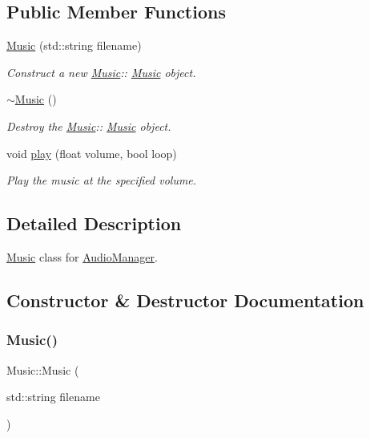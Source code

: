 \subsection*{Public Member Functions}
\begin{DoxyCompactItemize}
\item 
\hyperlink{class_music_a8169fdac350380994c08fe67062fc99d}{Music} (std\+::string filename)
\begin{DoxyCompactList}\small\item\em Construct a new \hyperlink{class_music}{Music}\+:\+: \hyperlink{class_music}{Music} object. \end{DoxyCompactList}\item 
\mbox{\label{class_music_a0b4f3b9a018207e0c08003505f1f87fe}} 
\hyperlink{class_music_a0b4f3b9a018207e0c08003505f1f87fe}{$\sim$\+Music} ()
\begin{DoxyCompactList}\small\item\em Destroy the \hyperlink{class_music}{Music}\+:\+: \hyperlink{class_music}{Music} object. \end{DoxyCompactList}\item 
void \hyperlink{class_music_a5ab263243b34b3f84e916b7b15854df5}{play} (float volume, bool loop)
\begin{DoxyCompactList}\small\item\em Play the music at the specified volume. \end{DoxyCompactList}\end{DoxyCompactItemize}


\subsection{Detailed Description}
\hyperlink{class_music}{Music} class for \hyperlink{class_audio_manager}{Audio\+Manager}. 

\subsection{Constructor \& Destructor Documentation}
\mbox{\label{class_music_a8169fdac350380994c08fe67062fc99d}} 
\subsubsection{\texorpdfstring{Music()}{Music()}}
{\footnotesize\ttfamily Music\+::\+Music (\begin{DoxyParamCaption}\item[{std\+::string}]{filename }\end{DoxyParamCaption})\hspace{0.3cm}{\ttfamily [explicit]}}



